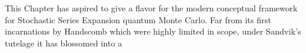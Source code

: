 \documentclass[vecphys]{svmult}
\begin{document}
This Chapter has aspired to give a flavor for the modern conceptual framework for Stochastic Series Expansion quantum Monte Carlo.  Far from its first incarnations by Handscomb which were highly limited in scope, under Sandvik's tutelage it has blossomed into a 


 
 
%
%


\printindex
\end{document}
